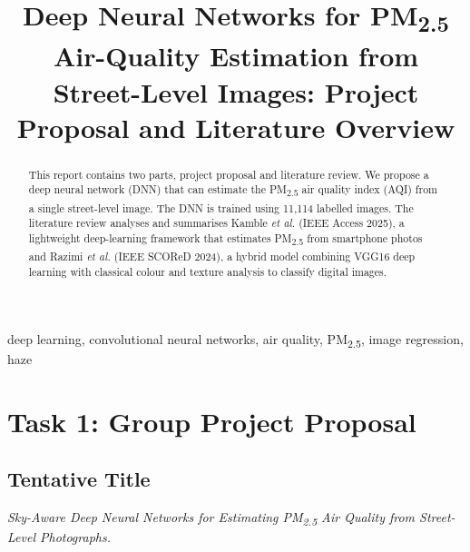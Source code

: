 \documentclass[conference]{IEEEtran}
\newcommand{\pmtwofive}{PM\textsubscript{2.5}}
\begin{document}
\title{Deep Neural Networks for \pmtwofive{} Air-Quality Estimation from Street-Level Images: Project Proposal and Literature Overview}

\author{
\and
{}
\and
{}
}

\maketitle

\begin{abstract}
This report contains two parts, project proposal and literature review. We propose a deep neural network (DNN) that can estimate the \pmtwofive{} air quality index (AQI) from a single street-level image. The DNN is trained using 11,114 labelled images. The literature review analyses and summarises Kamble \textit{et al.} (IEEE Access 2025), a lightweight deep-learning framework that estimates \pmtwofive{} from smartphone photos and Razimi \textit{et al.} (IEEE SCOReD 2024), a hybrid model combining VGG16 deep learning with classical colour and texture analysis to classify digital images.
\end{abstract}

\begin{IEEEkeywords}
deep learning, convolutional neural networks, air quality, \pmtwofive{}, image regression, haze
\end{IEEEkeywords}

\section{Task 1: Group Project Proposal}

\subsection{Tentative Title}
\textit{Sky-Aware Deep Neural Networks for Estimating \pmtwofive{} Air Quality from Street-Level Photographs.}
\end{document}
